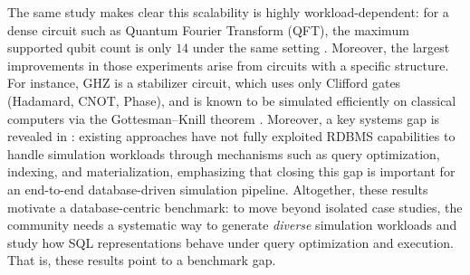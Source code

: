 The same study makes clear this scalability is highly workload-dependent: for a dense circuit such as Quantum Fourier Transform (QFT), the maximum supported qubit count is only $14$ under the same setting \cite{techreport}. Moreover, the largest improvements in those experiments arise from circuits with a specific structure. For instance, GHZ is a stabilizer circuit, which uses only Clifford gates (Hadamard, CNOT, Phase), and is known to be simulated efficiently on classical computers via the Gottesman–Knill theorem \cite{Aaronson_2004}. Moreover, a key systems gap is revealed in \cite{einsteinSQL2023, hai2025quantum}: existing approaches have not fully exploited RDBMS capabilities to handle simulation workloads through mechanisms such as query optimization, indexing, and materialization, emphasizing that closing this gap is important for an end-to-end database-driven simulation pipeline.
Altogether, these results motivate a database-centric benchmark: to move beyond isolated case studies, the community needs a systematic way to generate \emph{diverse} simulation workloads and study how SQL representations behave under query optimization and execution. 
That is, these results point to a benchmark gap. 

